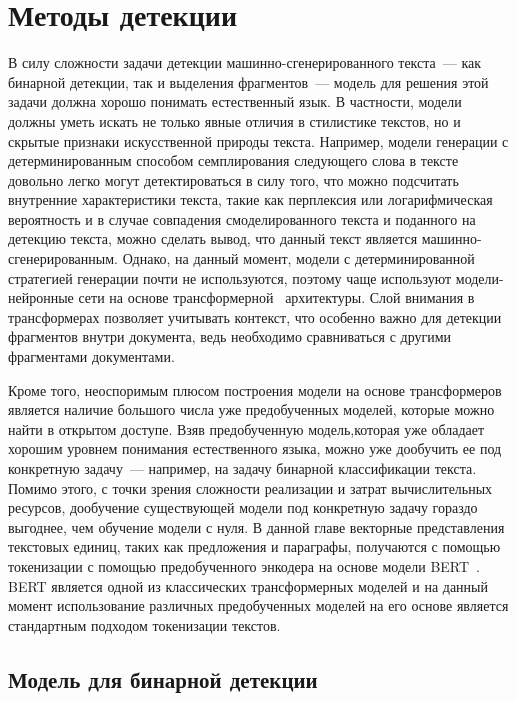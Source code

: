 \section{Методы детекции}

В силу сложности задачи детекции машинно-сгенерированного текста~--- как бинарной детекции, так и выделения фрагментов~--- модель для решения этой задачи должна хорошо понимать естественный язык. В частности, модели должны уметь искать не только явные отличия в стилистике текстов, но и скрытые признаки искусственной природы текста. Например, модели генерации с детерминированным способом семплирования следующего слова в тексте довольно легко могут детектироваться в силу того, что можно подсчитать внутренние характеристики текста, такие как перплексия или логарифмическая вероятность и в случае совпадения смоделированного текста и поданного на детекцию текста, можно сделать вывод, что данный текст является машинно-сгенерированным. Однако, на данный момент, модели с детерминированной стратегией генерации почти не используются, поэтому чаще используют модели-нейронные сети на основе трансформерной~\cite{Vaswani2017AttentionIA} архитектуры. Слой внимания в трансформерах позволяет учитывать контекст, что особенно важно для детекции фрагментов внутри документа, ведь необходимо сравниваться с другими фрагментами документами.

Кроме того, неоспоримым плюсом построения модели на основе трансформеров является наличие большого числа уже предобученных моделей, которые можно найти в открытом доступе. Взяв  предобученную модель,которая уже обладает хорошим уровнем понимания естественного языка, можно уже дообучить ее под конкретную задачу~--- например, на задачу бинарной классификации текста. Помимо этого, с точки зрения сложности реализации и затрат вычислительных ресурсов, дообучение существующей модели под конкретную задачу гораздо выгоднее, чем обучение модели с нуля. 
В данной главе векторные представления текстовых единиц, таких как предложения и параграфы, получаются с помощью токенизации с помощью предобученного энкодера на основе модели BERT~\cite{bert}. BERT является одной из классических трансформерных моделей и  на данный момент использование различных предобученных моделей на его основе является стандартным подходом токенизации текстов. 


\subsection{Модель для бинарной детекции}
\label{binary}

